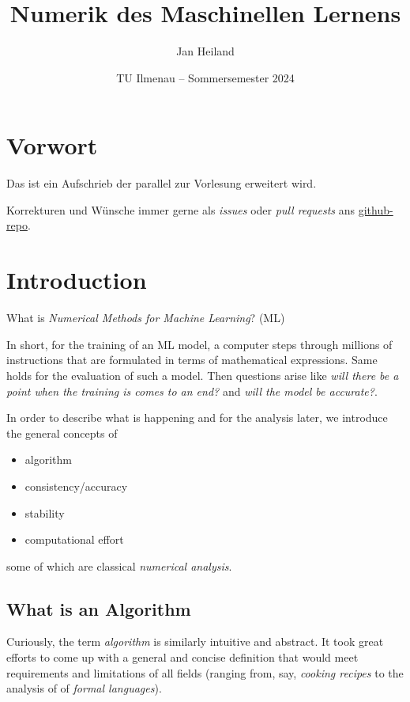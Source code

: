 \documentclass[
]{book}
\title{Numerik des Maschinellen Lernens}
\author{Jan Heiland}
\date{TU Ilmenau -- Sommersemester 2024}
\providecommand{\tightlist}{%
  \setlength{\itemsep}{0pt}\setlength{\parskip}{0pt}}
\theoremstyle{definition}
\theoremstyle{definition}
\theoremstyle{definition}
\theoremstyle{definition}
\theoremstyle{remark}
\begin{document}
\maketitle

{
\hypersetup{linkcolor=}
\setcounter{tocdepth}{1}
\tableofcontents
}
\hypertarget{vorwort}{%
\chapter*{Vorwort}\label{vorwort}}

Das ist ein Aufschrieb der parallel zur Vorlesung erweitert wird.

Korrekturen und Wünsche immer gerne als \emph{issues} oder \emph{pull requests} ans \href{https://github.com/highlando/script-nmdl}{github-repo}.

\hypertarget{introduction}{%
\chapter{Introduction}\label{introduction}}

What is \emph{Numerical Methods for Machine Learning}? (ML)

In short, for the training of an ML model, a computer steps through millions of instructions that are formulated in terms of mathematical expressions.
Same holds for the evaluation of such a model.
Then questions arise like \emph{will there be a point when the training is comes to an end?} and \emph{will the model be accurate?}.

In order to describe what is happening and for the analysis later, we introduce the general concepts of

\begin{itemize}
\tightlist
\item
  algorithm
\item
  consistency/accuracy
\item
  stability
\item
  computational effort
\end{itemize}

some of which are classical \emph{numerical analysis}.

\hypertarget{what-is-an-algorithm}{%
\section{What is an Algorithm}\label{what-is-an-algorithm}}

Curiously, the term \emph{algorithm} is similarly intuitive and abstract. It took great efforts to come up with a general and concise definition that would meet requirements and limitations of all fields (ranging from, say, \emph{cooking recipes} to the analysis of of \emph{formal languages}).
\end{document}
